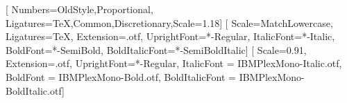 \usepackage[
  paperwidth=\gbanchopagina,
  paperheight=\gbaltopagina,
  inner=\gbmargeninterior,
  outer=\gbmargenexterior,
  top=\gbmargensuperior,
  bottom=\gbmargeninferior,
  includehead,
  includefoot,
  headsep=14pt,
  footskip=24pt
]{geometry}

%
\ifgbcruces
  \usepackage[width=\gbanchomontaje,height=\gbaltomontaje,cam,center]{crop}
\fi

\addto\captionsspanish{\renewcommand{\contentsname}{Sumario}}

\usepackage{fontspec}
\usepackage[final,babel=true]{microtype}

\def\gbfuentetexto{Libertinus Serif}
\def\gbfuentetitulos{IBM Plex Sans Condensed}
\def\gbfuentemono{IBM Plex Mono}

\setmainfont{\gbfuentetexto}[
  Numbers={OldStyle,Proportional},
  Ligatures={TeX,Common,Discretionary},Scale=1.18]
\setsansfont{\gbfuentetitulos}[
Scale=MatchLowercase,
Ligatures=TeX,
Extension=.otf,
UprightFont=*-Regular,
ItalicFont=*-Italic,
BoldFont=*-SemiBold,
BoldItalicFont=*-SemiBoldItalic]
\setmonofont{\gbfuentemono}[
Scale=0.91,
Extension=.otf,
UprightFont=*-Regular,
ItalicFont = IBMPlexMono-Italic.otf,
BoldFont = IBMPlexMono-Bold.otf,
BoldItalicFont = IBMPlexMono-BoldItalic.otf]

